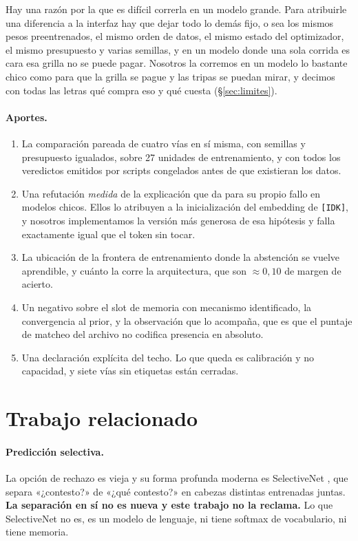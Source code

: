 \documentclass[11pt,a4paper]{article}
\begin{document}
Hay una razón por la que es difícil correrla en un modelo grande. Para atribuirle una diferencia a la
interfaz hay que dejar todo lo demás fijo, o sea los mismos pesos preentrenados, el mismo orden de
datos, el mismo estado del optimizador, el mismo presupuesto y varias semillas, y en un modelo donde
una sola corrida es cara esa grilla no se puede pagar. Nosotros la corremos en un modelo lo bastante
chico como para que la grilla se pague y las tripas se puedan mirar, y decimos con todas las letras
qué compra eso y qué cuesta (§\ref{sec:limites}).

\paragraph{Aportes.}
\begin{enumerate}
\item La comparación pareada de cuatro vías en sí misma, con semillas y presupuesto igualados, sobre
27 unidades de entrenamiento, y con todos los veredictos emitidos por scripts congelados antes de que
existieran los datos.
\item Una refutación \emph{medida} de la explicación que \citet{cohen2024idk} da para su propio
fallo en modelos chicos. Ellos lo atribuyen a la inicialización del embedding de \texttt{[IDK]}, y
nosotros implementamos la versión más generosa de esa hipótesis y falla exactamente igual que el
token sin tocar.
\item La ubicación de la frontera de entrenamiento donde la abstención se vuelve aprendible, y cuánto
la corre la arquitectura, que son $\approx 0{,}10$ de margen de acierto.
\item Un negativo sobre el slot de memoria con mecanismo identificado, la convergencia al prior, y la
observación que lo acompaña, que es que el puntaje de matcheo del archivo no codifica presencia en
absoluto.
\item Una declaración explícita del techo. Lo que queda es calibración y no capacidad, y siete vías
sin etiquetas están cerradas.
\end{enumerate}

\section{Trabajo relacionado}

\paragraph{Predicción selectiva.} La opción de rechazo es vieja \citep{chow1970} y su forma profunda
moderna es SelectiveNet \citep{geifman2019selectivenet}, que separa «¿contesto?» de «¿qué contesto?»
en cabezas distintas entrenadas juntas. \textbf{La separación en sí no es nueva y este trabajo no la
reclama.} Lo que SelectiveNet no es, es un modelo de lenguaje, ni tiene softmax de vocabulario, ni
tiene memoria.
\end{document}
